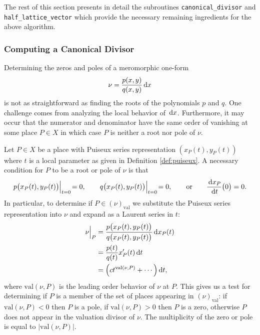 The rest of this section presents in detail the subroutines
\verb=canonical_divisor= and \verb=half_lattice_vector= which provide the
necessary remaining ingredients for the above algorithm.



\subsubsection{Computing a Canonical Divisor}\label{sec:canonical}



Determining the zeros and poles of a meromorphic one-form
\begin{equation} \label{eqn:meromorphic-one-form}
\nu = \frac{p(x,y)}{q(x,y)}\,\mathrm{d}x
\end{equation}
is not as straightforward as finding the roots of the polynomials $p$ and $q$.
One challenge comes from analyzing the local behavior of $\,\mathrm{d}x$. Furthermore, it
may occur that the numerator and denominator have the same order of vanishing at
some place $P \in X$ in which case $P$ is neither a root nor pole of $\nu$.

Let $P \in X$ be a place with Puiseux series representation $(x_P(t), y_P(t))$
where $t$ is a local parameter as given in Definition \ref{def:puiseux}. A
necessary condition for $P$ to be a root or pole of $\nu$ is that
\begin{equation}
  p\big(x_P(t), y_P(t)\big) \Big|_{t=0} \! = 0,
  \qquad
  q\big(x_P(t), y_P(t)\big) \Big|_{t=0} \! = 0,
  \qquad \text{or} \qquad
  \frac{\,\mathrm{d}x_P}{\,\mathrm{d}t}\big(0\big) = 0.
\end{equation}
In particular, to determine if $P \in (\nu)_\text{val}$ we substitute the
Puiseux series representation into $\nu$ and expand as a Laurent series in $t$:
\begin{align} \label{eqn:localization}
\nu \Big|_P
&=
\frac{p\big(x_P(t),y_P(t)\big)}{q\big(x_P(t),y_P(t)\big)} \,\mathrm{d}x_P(t) \notag \\
&=
\frac{p(t)}{q(t)} x_P'(t) \,\mathrm{d}t \notag \\
&=
\Big( c t^{\text{val}(\nu,P)} + \cdots \Big) \,\mathrm{d}t,
\end{align}
where $\text{val}(\nu,P)$ is the leading order behavior of $\nu$ at $P$. This
gives us a test for determining if $P$ is a member of the set of places
appearing in $(\nu)_\text{val}$: if $\text{val}(\nu,P) < 0$ then $P$ is a pole,
if $\text{val}(\nu,P) > 0$ then $P$ is a zero, otherwise $P$ does not appear in
the valuation divisor of $\nu$. The multiplicity of the zero or pole is equal to
$|\text{val}(\nu,P)|$.

